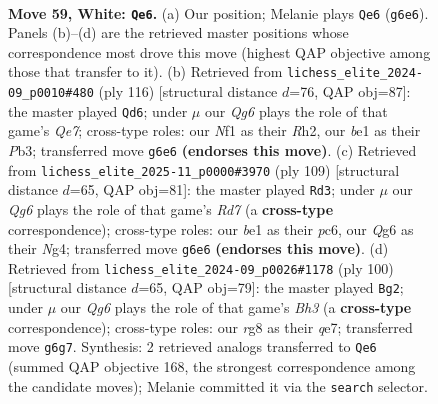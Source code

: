 \documentclass[11pt]{article}
\begin{document}
\clearpage

\begin{figure}[p]\centering
\begin{subfigure}{0.46\textwidth}\centering
\resizebox{\linewidth}{!}{%
\newchessgame
\chessboard[
  setfen={1r4r1/p5p1/6Qp/1k1p3P/p2P2P1/q3P3/7K/4bN2 w - - 26 59},
  showmover=false,
  pgfstyle=straightmove, color=movearrow, markmove={g6-e6}
]}
\caption{}
\end{subfigure}\hfill
\begin{subfigure}{0.46\textwidth}\centering
\resizebox{\linewidth}{!}{%
\newchessgame
\chessboard[
  setfen={k1b4r/1p2Qp1r/2p4P/P2pP3/3P4/1P3P2/1K5R/8 w - - 1 59},
  showmover=false,
  pgfstyle=straightmove, color=movearrow, markmove={e7-d6}
]}
\caption{}
\end{subfigure}
\\[4pt]
\begin{subfigure}{0.46\textwidth}\centering
\resizebox{\linewidth}{!}{%
\newchessgame
\chessboard[
  setfen={8/p4Q2/2P3pk/4p2p/3qP1nP/P5P1/3r1P2/4RRK1 b - - 0 55},
  showmover=false,
  pgfstyle=straightmove, color=movearrow, markmove={d2-d3}
]}
\caption{}
\end{subfigure}\hfill
\begin{subfigure}{0.46\textwidth}\centering
\resizebox{\linewidth}{!}{%
\newchessgame
\chessboard[
  setfen={4r1k1/4q3/p3p1p1/2p1Q1P1/2P2P2/1P5B/8/6K1 w - - 0 51},
  showmover=false,
  pgfstyle=straightmove, color=movearrow, markmove={h3-g2}
]}
\caption{}
\end{subfigure}
\caption{\textbf{Move 59, White: \texttt{Qe6}.} (a) Our position; Melanie plays \texttt{Qe6} (\texttt{g6e6}). Panels (b)--(d) are the retrieved master positions whose correspondence most drove this move (highest QAP objective among those that transfer to it). (b) Retrieved from \texttt{lichess\_elite\_2024-09\_p0010\#480} (ply 116) [structural distance $d$=76, QAP obj=87]: the master played \texttt{Qd6}; under $\mu$ our \emph{Qg6} plays the role of that game's \emph{Qe7}; cross-type roles: our \emph{N}f1 as their \emph{R}h2, our \emph{b}e1 as their \emph{P}b3; transferred move \texttt{g6e6} \textbf{(endorses this move)}. (c) Retrieved from \texttt{lichess\_elite\_2025-11\_p0000\#3970} (ply 109) [structural distance $d$=65, QAP obj=81]: the master played \texttt{Rd3}; under $\mu$ our \emph{Qg6} plays the role of that game's \emph{Rd7} (a \textbf{cross-type} correspondence); cross-type roles: our \emph{b}e1 as their \emph{p}c6, our \emph{Q}g6 as their \emph{N}g4; transferred move \texttt{g6e6} \textbf{(endorses this move)}. (d) Retrieved from \texttt{lichess\_elite\_2024-09\_p0026\#1178} (ply 100) [structural distance $d$=65, QAP obj=79]: the master played \texttt{Bg2}; under $\mu$ our \emph{Qg6} plays the role of that game's \emph{Bh3} (a \textbf{cross-type} correspondence); cross-type roles: our \emph{r}g8 as their \emph{q}e7; transferred move \texttt{g6g7}. Synthesis: 2 retrieved analogs transferred to \texttt{Qe6} (summed QAP objective 168, the strongest correspondence among the candidate moves); Melanie committed it via the \texttt{search} selector.}
\label{fig:thought-m116}
\end{figure}
\end{document}
